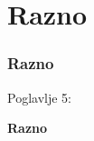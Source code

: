 %

\section{Razno}
\begin{frame}[fragile]
	\frametitle{Razno}

	\begin{center}\huge{Poglavlje 5:}\end{center}
	\begin{center}\huge{\color{typo3darkgrey}\textbf{Razno}}\end{center}

\end{frame}



